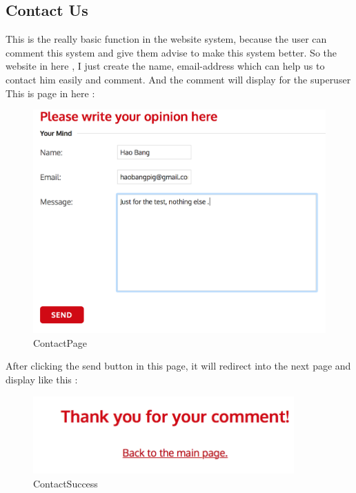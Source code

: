 \documentclass[12pt]{article}
\begin{document}
\subsection{Contact Us}
This is the really basic function in the website system, because the user can comment this system and give them advise to make this system better. So the website in here , I just create the name, email-address which can help us to contact him easily and comment. And the comment  will display for the superuser This is page in here :
\begin{figure}[H]
	\centering	
\includegraphics[width=15cm]{images/ContactPage.jpg}
	\caption[ContactPage]{ContactPage}
	\label{ContactPage}
\end{figure}

After clicking  the send button in this page, it will redirect into the next page and display like this :

\begin{figure}[H]
\centering	
\includegraphics[width=10cm]{images/ContactSuccess.jpg}
\caption[ContactSuccess]{ContactSuccess}
\label{ContactSuccess}
\end{figure}
\newpage


\end{document}
